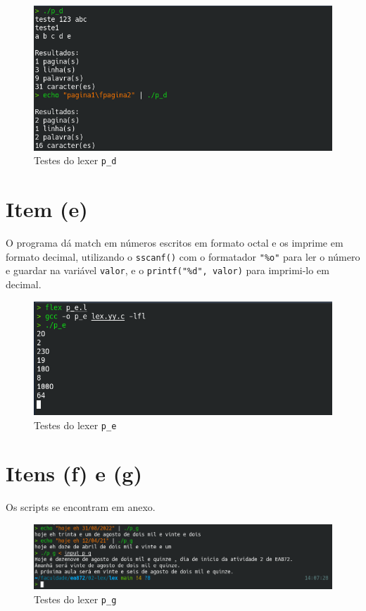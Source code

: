 \documentclass{article}
\begin{document}
\begin{figure}[!ht]
    \begin{center}
        \includegraphics[width=\textwidth]{images/item_d.png}
        \caption{Testes do lexer \texttt{p\_d}}
    \end{center}
\end{figure} 

\newpage
\section*{Item (e)}

O programa dá match em números escritos em formato octal e os imprime em formato decimal, utilizando o \texttt{sscanf()} com o formatador \texttt{"\%o"} para ler o número e guardar na variável \texttt{valor}, e o \texttt{printf("\%d", valor)} para imprimi-lo em decimal.

\begin{figure}[!ht]
    \begin{center}
        \includegraphics[width=\textwidth]{images/item_e.png}
        \caption{Testes do lexer \texttt{p\_e}}
    \end{center}
\end{figure} 

\section*{Itens (f) e (g)}

Os scripts se encontram em anexo.

\begin{figure}[!ht]
    \begin{center}
        \includegraphics[width=\textwidth]{images/item_g.png}
        \caption{Testes do lexer \texttt{p\_g}}
    \end{center}
\end{figure} 
\end{document}

